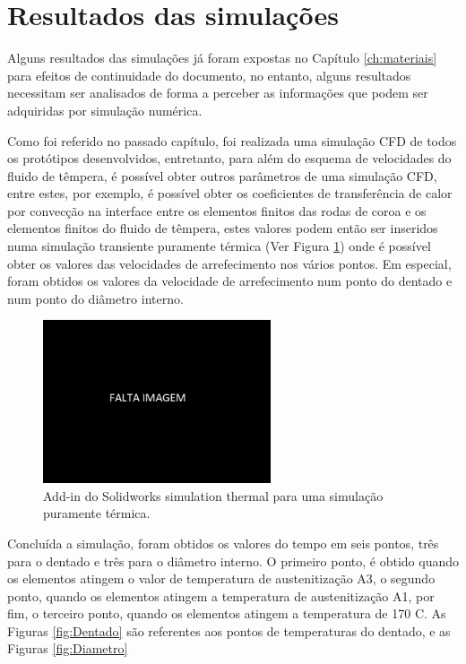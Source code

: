 \section{Resultados das simulações} \label{sec:resultados_simulacoes}
Alguns resultados das simulações já foram expostas no Capítulo \ref{ch:materiais} para efeitos de continuidade do documento, no entanto, alguns resultados necessitam ser analisados de forma a perceber as informações que podem ser adquiridas por simulação numérica.
\par
Como foi referido no passado capítulo, foi realizada uma simulação CFD de todos os protótipos desenvolvidos, entretanto, para além do esquema de velocidades do fluido de têmpera, é possível obter outros parâmetros de uma simulação CFD, entre estes, por exemplo, é possível obter os coeficientes de transferência de calor por convecção na interface entre os elementos finitos das rodas de coroa e os elementos finitos do fluido de têmpera, estes valores podem então ser inseridos numa simulação transiente puramente térmica (Ver Figura \ref{fig:simulacao_termica}) onde é possível obter os valores das velocidades de arrefecimento nos vários pontos. Em especial, foram obtidos os valores da velocidade de arrefecimento num ponto do dentado e num ponto do diâmetro interno.
\begin{figure}[htb]
    \centering
    \includegraphics[width = 0.6\textwidth]{Figures/Cap4/Falta_Imagem.png}
    \caption[Simulação puramente térmica Solidworks]%
    {Add-in do Solidworks simulation thermal para uma simulação puramente térmica.}
    \label{fig:simulacao_termica}
\end{figure}
\par
Concluída a simulação, foram obtidos os valores do tempo em seis pontos, três para o dentado e três para o diâmetro interno. O primeiro ponto, é obtido quando os elementos atingem o valor de temperatura de austenitização A3, o segundo ponto, quando os elementos atingem a temperatura de austenitização A1, por fim, o terceiro ponto, quando os elementos atingem a temperatura de 170 \textdegree C. As Figuras \ref{fig:Dentado} são referentes aos pontos de temperaturas do dentado, e as Figuras \ref{fig:Diametro}
